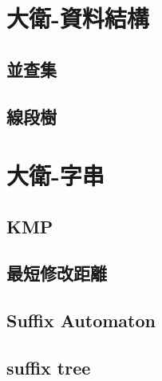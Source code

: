 \section{大衛-資料結構}
\subsection{並查集}
\raggedbottom
\hrulefill
\subsection{線段樹}
\raggedbottom
\hrulefill

\section{大衛-字串}
\subsection{KMP}
\raggedbottom
\hrulefill
\subsection{最短修改距離}
\raggedbottom
\hrulefill
\subsection{Suffix Automaton}
\raggedbottom
\hrulefill
\subsection{suffix tree}
\raggedbottom
\hrulefill

